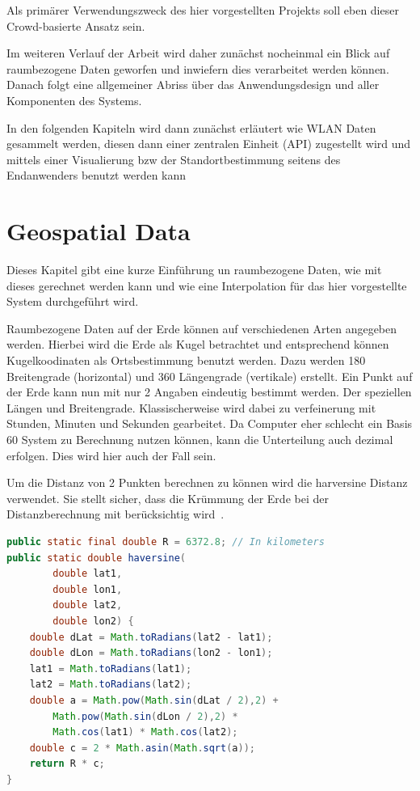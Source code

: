\documentclass[11pt,a4paper]{article}
\begin{document}
Als primärer Verwendungszweck des hier vorgestellten Projekts soll eben dieser Crowd-basierte Ansatz sein.

Im weiteren Verlauf der Arbeit wird daher zunächst nocheinmal ein Blick auf raumbezogene Daten geworfen und inwiefern dies verarbeitet werden können. Danach folgt eine allgemeiner Abriss über das Anwendungsdesign und aller Komponenten des Systems. 

In den folgenden Kapiteln wird dann zunächst erläutert wie WLAN Daten gesammelt werden, diesen dann einer zentralen Einheit (API) zugestellt wird und mittels einer Visualierung bzw der Standortbestimmung seitens des Endanwenders benutzt werden kann


\section{Geospatial Data}

Dieses Kapitel gibt eine kurze Einführung un raumbezogene Daten, wie mit dieses gerechnet werden kann und wie eine Interpolation für das hier vorgestellte System durchgeführt wird.

Raumbezogene Daten auf der Erde können auf verschiedenen Arten angegeben werden. Hierbei wird die Erde als Kugel betrachtet und entsprechend können Kugelkoodinaten als Ortsbestimmung benutzt werden. Dazu werden 180 Breitengrade (horizontal) und 360 Längengrade (vertikale) erstellt. Ein Punkt auf der Erde kann nun mit nur 2 Angaben eindeutig bestimmt werden. Der speziellen Längen und Breitengrade. Klassischerweise wird dabei zu verfeinerung mit Stunden, Minuten und Sekunden gearbeitet. Da Computer eher schlecht ein Basis 60 System zu Berechnung nutzen können, kann die Unterteilung auch dezimal erfolgen. Dies wird hier auch der Fall sein. 

Um die Distanz von 2 Punkten berechnen zu können wird die harversine Distanz verwendet. Sie stellt sicher, dass die Krümmung der Erde bei der Distanzberechnung mit berücksichtig wird~\cite{harversine_distance}.

\begin{lstlisting}[language=Java]
public static final double R = 6372.8; // In kilometers
public static double haversine(
		double lat1, 
		double lon1, 
		double lat2, 
		double lon2) {
    double dLat = Math.toRadians(lat2 - lat1);
    double dLon = Math.toRadians(lon2 - lon1);
    lat1 = Math.toRadians(lat1);
    lat2 = Math.toRadians(lat2);
    double a = Math.pow(Math.sin(dLat / 2),2) +
    	Math.pow(Math.sin(dLon / 2),2) * 
    	Math.cos(lat1) * Math.cos(lat2);
    double c = 2 * Math.asin(Math.sqrt(a));
    return R * c;
}
\end{lstlisting}
\end{document}
